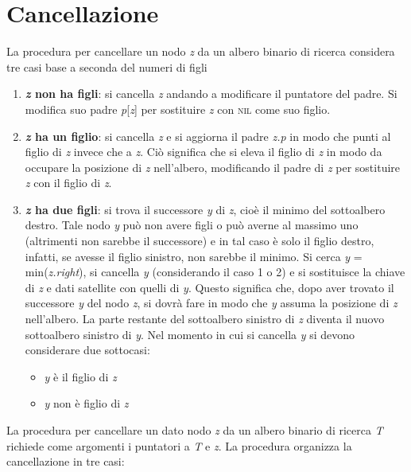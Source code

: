 \documentclass[10pt, a4paper]{report}
\begin{document}
\section{Cancellazione}
La procedura per cancellare un nodo \textit{z} da un albero binario di ricerca considera tre casi base a seconda del numeri di figli
\begin{enumerate}
\item \textbf{\textit{z} non ha figli}: si cancella \textit{z} andando a modificare il puntatore del padre. Si modifica suo padre \textit{p}[\textit{z}] per sostituire \textit{z} con \textsc{nil} come suo figlio.
\item \textbf{\textit{z} ha un figlio}: si cancella \textit{z} e si aggiorna il padre \textit{z.p} in modo che punti al figlio di \textit{z} invece che a \textit{z}. Ciò significa che si eleva il figlio di \textit{z} in modo da occupare la posizione di \textit{z} nell'albero, modificando il padre di \textit{z} per sostituire \textit{z} con il figlio di \textit{z}.
\item \textbf{\textit{z} ha due figli}: si trova il successore \textit{y} di \textit{z}, cioè il minimo del sottoalbero destro. Tale nodo \textit{y} può non avere figli o può averne al massimo uno (altrimenti non sarebbe il successore) e in tal caso è solo il figlio destro, infatti, se avesse il figlio sinistro, non sarebbe il minimo. Si cerca \textit{y} = min(\textit{z.right}), si cancella \textit{y} (considerando il caso 1 o 2) e si sostituisce la chiave di \textit{z} e dati satellite con quelli di \textit{y}. Questo significa che, dopo aver trovato il successore \textit{y} del nodo \textit{z}, si dovrà fare in modo che \textit{y} assuma la posizione di \textit{z} nell'albero. La parte restante del sottoalbero sinistro di \textit{z} diventa il nuovo sottoalbero sinistro di \textit{y}. Nel momento in cui si cancella \textit{y} si devono considerare due sottocasi:
\begin{itemize}
\item \textit{y} è il figlio di \textit{z}
\item \textit{y} non è figlio di \textit{z}
\end{itemize}
\end{enumerate}
La procedura per cancellare un dato nodo \textit{z} da un albero binario di ricerca \textit{T} richiede come argomenti i puntatori a \textit{T} e \textit{z}. La procedura organizza la cancellazione in tre casi:
\end{document}
